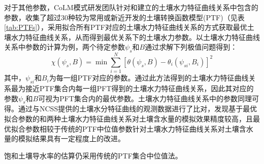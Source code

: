 对于其他参数，CoLM模式研发团队针对\citet{campbell1974}和\citet{van1980closed}建立的土壤水力特征曲线关系中包含的参数，收集了超过30种较为常用或新近开发的土壤转换函数模型(PTF)（见表\ref{tab:PTFs}），采用拟合所有PTF对应的土壤水力特征曲线关系的方式获取最优土壤水力特征曲线关系，从而得到最优关系下的土壤水力参数。以\citet{campbell1974}土壤水力特征曲线关系中参数的计算为例，两个待定参数$\psi_s$和$B$通过求解下列极值问题得到：$$\chi\left(\psi_s,B\right)=\min\sum_{i=1}^N\left[\theta\left(\psi_s,B\right)-\theta_i\left(\psi_{si},B_{i}\right)\right]^2$$
其中，$\psi_{si}$和$B_{i}$为每一组PTF对应的参数。通过此方法得到的土壤水力特征曲线关系最为接近PTF集合内每一组PFT得到的土壤水力特征曲线关系，因此其对应的参数$\psi_{s}$和$B$可视为PFT集合内的最优参数。\citet{van1980closed}土壤水力特征曲线关系中的参数同理可得。\citep{dai2019parameters}通过与NCSS提供的土壤水分特征曲线的观测数据进行了比对，发现基于最优拟合参数的\citet{campbell1974}和\citet{van1980closed}两种土壤水力特征曲线关系对土壤含水量的模拟效果精度较高，且最优拟合参数相较于传统的PTF中位值参数针对土壤水力特征曲线关系对土壤含水量的模拟结果具有一定程度上的改进。

饱和土壤导水率的估算仍采用传统的PTF集合中位值法。


